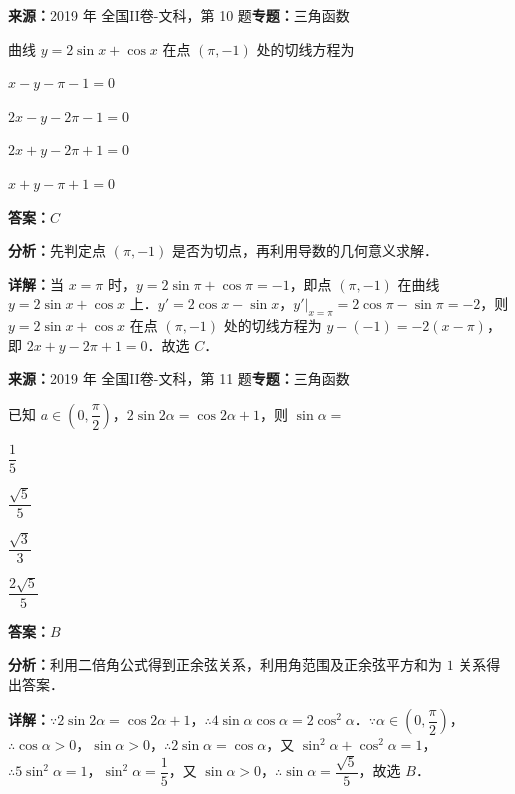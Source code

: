 \begin{question}[points=5]
\textbf{来源：}2019 年 全国II卷-文科，第 10 题\quad \textbf{专题：}三角函数\par
曲线 $y=2\sin x+\cos x$ 在点 $(\pi,-1)$ 处的切线方程为
\begin{choices}
  \item $x-y-\pi-1=0$
  \item $2x-y-2\pi-1=0$
  \item $2x+y-2\pi+1=0$
  \item $x+y-\pi+1=0$
\end{choices}
\begin{solution}
\textbf{答案：}$C$

\textbf{分析：}先判定点 $(\pi,-1)$ 是否为切点，再利用导数的几何意义求解．

\textbf{详解：}当 $x=\pi$ 时，$y=2\sin\pi+\cos\pi=-1$，即点 $(\pi,-1)$ 在曲线 $y=2\sin x+\cos x$ 上．$y'=2\cos x-\sin x$，$y'|_{x=\pi}=2\cos\pi-\sin\pi=-2$，则 $y=2\sin x+\cos x$ 在点 $(\pi,-1)$ 处的切线方程为 $y-(-1)=-2(x-\pi)$，即 $2x+y-2\pi+1=0$．故选 $C$．
\end{solution}
\end{question}

\begin{question}[points=5]
\textbf{来源：}2019 年 全国II卷-文科，第 11 题\quad \textbf{专题：}三角函数\par
已知 $a\in\left(0,\dfrac{\pi}{2}\right)$，$2\sin2\alpha=\cos2\alpha+1$，则 $\sin\alpha=$
\begin{choices}
  \item $\dfrac{1}{5}$
  \item $\dfrac{\sqrt{5}}{5}$
  \item $\dfrac{\sqrt{3}}{3}$
  \item $\dfrac{2\sqrt{5}}{5}$
\end{choices}
\begin{solution}
\textbf{答案：}$B$

\textbf{分析：}利用二倍角公式得到正余弦关系，利用角范围及正余弦平方和为 $1$ 关系得出答案．

\textbf{详解：}$\because 2\sin2\alpha=\cos2\alpha+1$，$\therefore 4\sin\alpha\cos\alpha=2\cos^2\alpha$．$\because \alpha\in\left(0,\dfrac{\pi}{2}\right)$，$\therefore \cos\alpha>0$，$\sin\alpha>0$，$\therefore 2\sin\alpha=\cos\alpha$，又 $\sin^2\alpha+\cos^2\alpha=1$，$\therefore 5\sin^2\alpha=1$，$\sin^2\alpha=\dfrac{1}{5}$，又 $\sin\alpha>0$，$\therefore \sin\alpha=\dfrac{\sqrt{5}}{5}$，故选 $B$．
\end{solution}
\end{question}

